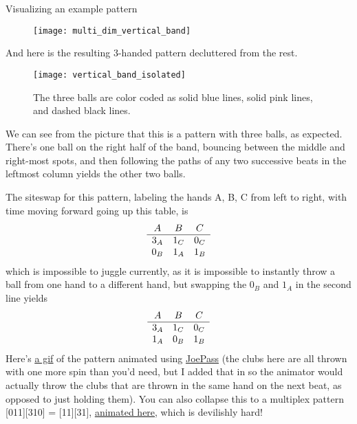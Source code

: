 \documentclass[12nt]{article}
\theoremstyle{plain}
\begin{document}
\begin{subsection}{Visualizing an example pattern}
\begin{figure}[h]
\texttt{[image: multi\_dim\_vertical\_band]}
\end{figure}

\clearpage
And here is the resulting 3-handed pattern decluttered from the rest.

\begin{figure}[h]
\texttt{[image: vertical\_band\_isolated]}
\caption{The three balls are color coded as solid blue lines, solid pink lines, and dashed black lines.}
\end{figure}

We can see from the picture that this is a pattern with three balls, as expected. There's one ball on the right half of the band, bouncing between the middle and right-most spots, and then following the paths of any two successive beats in the leftmost column yields the other two balls. 

The siteswap for this pattern, labeling the hands A, B, C from left to right, with time moving forward going up this table, is 
\[
\begin{array}{c c c}
A & B & C \\
\hline 3_A & 1_C & 0_C \\
0_B & 1_A & 1_B 
\end{array}
\]
which is impossible to juggle currently, as it is impossible to instantly throw a ball from one hand to a different hand, but swapping the $0_B$ and $1_A$ in the second line yields
\[
\begin{array}{c c c}
A & B & C \\
\hline 3_A & 1_C & 0_C \\
1_A & 0_B & 1_B 
\end{array}
\]
Here's \underline{\textcolor{blue}{\href{https://media.giphy.com/media/CU0Xn1m2CXLPVP5l1w/giphy.gif}{a gif}}} of the pattern animated using \underline{\textcolor{blue}{\href{http://westerboer.net/w/?page_id=151}{JoePass}}} (the clubs here are all thrown with one more spin than you'd need, but I added that in so the animator would actually throw the clubs that are thrown in the same hand on the next beat, as opposed to just holding them). You can also collapse this to a multiplex pattern [011][310] = [11][31], \underline{\textcolor{blue}{\href{https://jugglingedge.com/help/siteswapanimator.php?Pattern=\%5B31\%5D\%5B11\%5D}{animated here}}}, which is devilishly hard!

\end{subsection}
\end{document}

